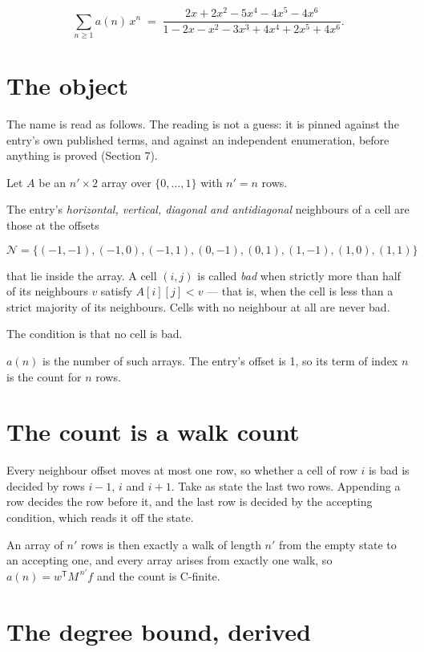 \documentclass[11pt]{article}
\theoremstyle{definition}
\begin{document}
\[\sum_{n \ge 1} a(n)\,x^n \;=\; \frac{2x + 2x^{2} - 5x^{4} - 4x^{5} - 4x^{6}}{1 - 2x - x^{2} - 3x^{3} + 4x^{4} + 2x^{5} + 4x^{6}}.\]

\section{The object}

The name is read as follows. The reading is not a guess: it is pinned against the entry's own published terms, and against an independent enumeration, before anything is proved (Section 7).

Let $A$ be an $n' \times 2$ array over $\{0,\dots,1\}$ with $n' = n$ rows.

The entry's {\itshape horizontal, vertical, diagonal and antidiagonal} neighbours of a cell are those at the offsets

\[\mathcal{N} = \{(-1,-1), (-1,0), (-1,1), (0,-1), (0,1), (1,-1), (1,0), (1,1)\}\]

that lie inside the array. A cell $(i,j)$ is called {\itshape bad} when strictly more than half of its neighbours $v$ satisfy $A[i][j] < v$ --- that is, when the cell is less than a strict majority of its neighbours. Cells with no neighbour at all are never bad.

The condition is that no cell is bad.

$a(n)$ is the number of such arrays. The entry's offset is 1, so its term of index $n$ is the count for $n$ rows.

\section{The count is a walk count}

Every neighbour offset moves at most one row, so whether a cell of row $i$ is bad is decided by rows $i-1$, $i$ and $i+1$. Take as state the last two rows. Appending a row decides the row before it, and the last row is decided by the accepting condition, which reads it off the state.

An array of $n'$ rows is then exactly a walk of length $n'$ from the empty state to an accepting one, and every array arises from exactly one walk, so $a(n) = w^{\mathsf T}M^{\,n'}f$ and the count is C-finite.

\section{The degree bound, derived}
\end{document}
